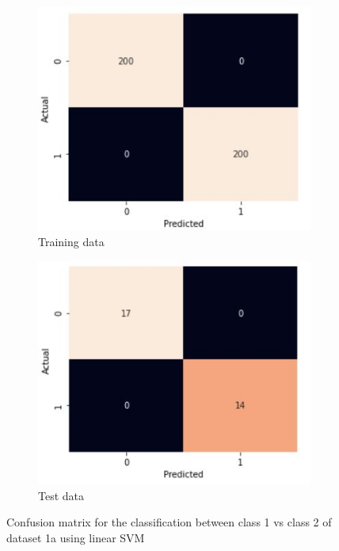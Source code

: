 \documentclass[11pt]{article}
\begin{document}
\begin{figure}[h]
\centering
	\begin{subfigure}[b]{0.45\textwidth}
	\centering
	\includegraphics[scale=0.35]{dataset1a_linear_svm_12_cm_train.jpg}
	\caption{Training data}
	\label{fig:fig1.3.4.1}
	\end{subfigure}
	\begin{subfigure}[b]{0.45\textwidth}
	\centering
	\includegraphics[scale=0.35]{dataset1a_linear_svm_12_cm_test.jpg}
	\caption{Test data}
	\label{fig:fig1.3.4.2}
	\end{subfigure}
\caption{Confusion matrix for the classification between class 1 vs class 2 of dataset 1a using linear SVM}
\label{fig:fig1.3.4}
\end{figure}
\end{document}
